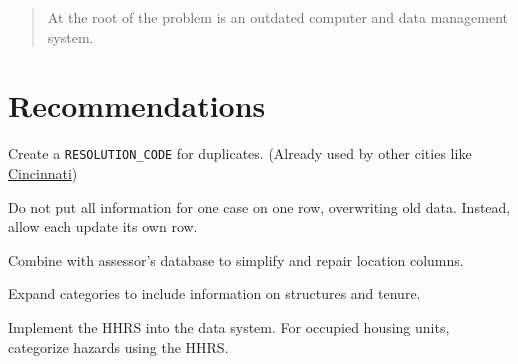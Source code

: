 \documentclass[
]{book}
\begin{document}
\begin{quote}
At the root of the problem is an outdated computer and data management system.
\end{quote}

\hypertarget{recommendations-1}{%
\section{Recommendations}\label{recommendations-1}}

Create a \texttt{RESOLUTION\_CODE} for duplicates. (Already used by other cities like \href{https://data.cincinnati-oh.gov/Thriving-Neighborhoods/Code-Enforcement/cncm-znd6}{Cincinnati})

Do not put all information for one case on one row, overwriting old data. Instead, allow each update its own row.

Combine with assessor's database to simplify and repair location columns.

Expand categories to include information on structures and tenure.

Implement the HHRS into the data system. For occupied housing units, categorize hazards using the HHRS.

  
\end{document}
